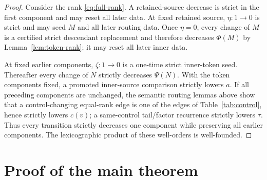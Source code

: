 \begin{proof}
Consider the rank \eqref{eq:full-rank}. A retained-source decrease is strict in
the first component and may reset all later data. At fixed retained source,
$\eta:1\to0$ is strict and may seed $M$ and all later routing data. Once
$\eta=0$, every change of $M$ is a certified strict descendant replacement
and therefore decreases $\Phi(M)$ by Lemma~\ref{lem:token-rank}; it may reset
all later inner data.

At fixed earlier components, $\zeta:1\to0$ is a one-time strict inner-token
seed. Thereafter every change of $N$ strictly decreases $\Psi(N)$. With the
token components fixed, a promoted inner-source comparison strictly lowers
$a$. If all preceding components are unchanged, the semantic routing lemmas
above show that a control-changing equal-rank edge is one of the edges of
Table~\ref{tab:control}, hence strictly lowers $c(v)$; a same-control
tail/factor recurrence strictly lowers $\tau$. Thus every transition
strictly decreases one component while preserving all earlier components.
The lexicographic product of these well-orders is well-founded.
\end{proof}

\section{Proof of the main theorem}

